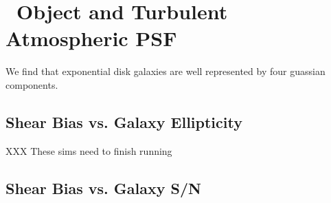 \documentclass[12pt,preprint]{aastex}
\newcommand{\psf}{PSF}
\begin{document}
\section{\devauc\ Object and Turbulent Atmospheric \psf}

We find that exponential disk galaxies are well represented by four guassian
components.

\subsection{Shear Bias vs. Galaxy Ellipticity}


XXX These sims need to finish running



\subsection{Shear Bias vs. Galaxy S/N}
\end{document}
